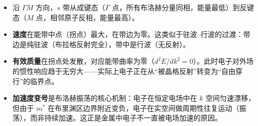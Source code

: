\begin{insightbox}[物理图像]
\begin{itemize}
    \item 沿 $\Gamma M$ 方向，$s$ 带从成键态（$\Gamma$ 点，所有布洛赫分量同相，能量最低）到反键态（$M$ 点，相邻原子反相，能量最高）。
    \item \textbf{速度}在能带中点（拐点）最大，在带边为零。这类似于驻波--行波的过渡：带边是纯驻波（布拉格反射完全），带中是行波（无反射）。
    \item \textbf{有效质量}在拐点处发散，对应能带曲率为零（$d^2E/dk^2=0$）。此时电子对外场的惯性响应趋于无穷大——实际上电子正在从``被晶格反射''转变为``自由穿行''的临界点。
    \item \textbf{加速度变号}是布洛赫振荡的核心机制：电子在恒定电场中在 $k$ 空间匀速漂移，但由于 $m^*$ 在布里渊区边界附近变负，电子在实空间做周期性往复运动（振荡），而非持续加速。这正是金属中电子不一直被电场加速的原因。
\end{itemize}
\end{insightbox}
